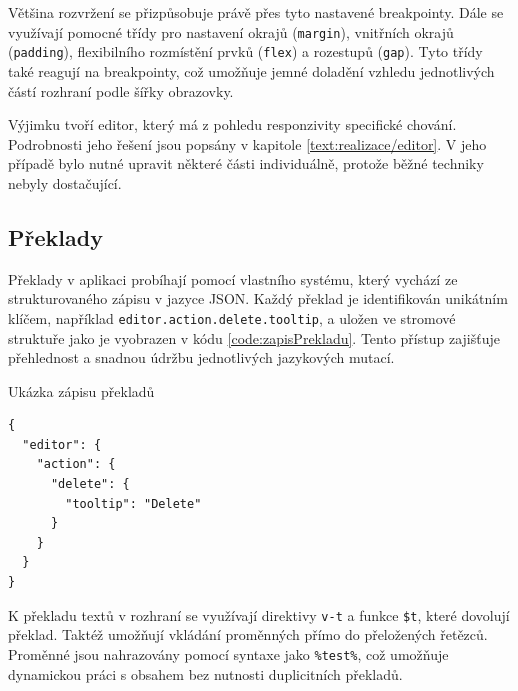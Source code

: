 Většina rozvržení se přizpůsobuje právě přes tyto nastavené breakpointy. 
Dále se využívají pomocné třídy pro nastavení okrajů (\texttt{margin}), vnitřních okrajů (\texttt{padding}), flexibilního rozmístění prvků (\texttt{flex}) a rozestupů (\texttt{gap}). 
Tyto třídy také reagují na breakpointy, což umožňuje jemné doladění vzhledu jednotlivých částí rozhraní podle šířky obrazovky.

Výjimku tvoří editor, který má z pohledu responzivity specifické chování. 
Podrobnosti jeho řešení jsou popsány v kapitole \ref{text:realizace/editor}. 
V jeho případě bylo nutné upravit některé části individuálně, protože běžné techniky nebyly dostačující.



\subsection{Překlady}

Překlady v aplikaci probíhají pomocí vlastního systému, který vychází ze strukturovaného zápisu v jazyce JSON. 
Každý překlad je identifikován unikátním klíčem, například \texttt{editor.action.delete.tooltip}, a uložen ve stromové struktuře jako je vyobrazen v kódu \ref{code:zapisPrekladu}.
Tento přístup zajišťuje přehlednost a snadnou údržbu jednotlivých jazykových mutací.


\begin{listing}[ht!]
\caption{Ukázka zápisu překladů}\label{code:zapisPrekladu}
\begin{verbatim}
{
  "editor": {
    "action": {
      "delete": {
        "tooltip": "Delete"
      }
    }
  }
}
\end{verbatim}
\end{listing}

K překladu textů v rozhraní se využívají direktivy \texttt{v-t} a funkce \texttt{\$t}, které dovolují překlad.
Taktéž umožňují vkládání proměnných přímo do přeložených řetězců. 
Proměnné jsou nahrazovány pomocí syntaxe jako \texttt{\%test\%}, což umožňuje dynamickou práci s obsahem bez nutnosti duplicitních překladů.

